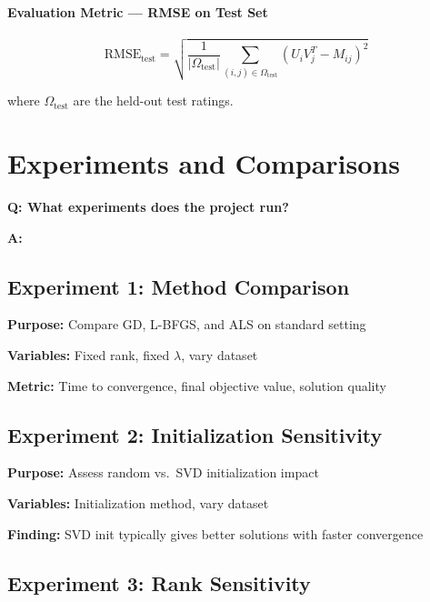 \documentclass[11pt,oneside]{article}
\newcommand{\question}[1]{\textbf{Q: #1}}
\newcommand{\answer}{\textbf{A: }}
\begin{document}
\paragraph{Evaluation Metric --- RMSE on Test Set}

\begin{equation}
    \text{RMSE}_{\text{test}} = \sqrt{\frac{1}{|\Omega_{\text{test}}|}\sum_{(i,j) \in \Omega_{\text{test}}}(U_i V_j^T - M_{ij})^2}
\end{equation}

where $\Omega_{\text{test}}$ are the held-out test ratings.

\section{Experiments and Comparisons}\label{sec:experiments}

\question{What experiments does the project run?}

\answer

\subsection*{Experiment 1: Method Comparison}

\textbf{Purpose:} Compare GD, L-BFGS, and ALS on standard setting

\textbf{Variables:} Fixed rank, fixed $\lambda$, vary dataset

\textbf{Metric:} Time to convergence, final objective value, solution quality

\subsection*{Experiment 2: Initialization Sensitivity}

\textbf{Purpose:} Assess random vs.\ SVD initialization impact

\textbf{Variables:} Initialization method, vary dataset

\textbf{Finding:} SVD init typically gives better solutions with faster convergence

\subsection*{Experiment 3: Rank Sensitivity}
\end{document}
